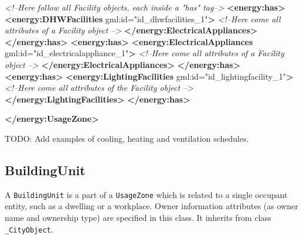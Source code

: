 \documentclass[a4paper,12pt]{article}
\newenvironment{Shaded}{}{}
\newcommand{\KeywordTok}[1]{\textcolor[rgb]{0.00,0.44,0.13}{\textbf{{#1}}}}
\newcommand{\StringTok}[1]{\textcolor[rgb]{0.25,0.44,0.63}{{#1}}}
\newcommand{\CommentTok}[1]{\textcolor[rgb]{0.38,0.63,0.69}{\textit{{#1}}}}
\newcommand{\OtherTok}[1]{\textcolor[rgb]{0.00,0.44,0.13}{{#1}}}
\begin{document}
\begin{Shaded}
\begin{Highlighting}[]
    \CommentTok{<!--Here follow all Facility objects, each inside a "has" tag-->}
    \KeywordTok{<energy:has>}
        \KeywordTok{<energy:DHWFacilities}\OtherTok{ gml:id=}\StringTok{"id_dhwfacilities_1"}\KeywordTok{>}
            \CommentTok{<!--Here come all attributes of a Facility object -->}
        \KeywordTok{</energy:ElectricalAppliances>}
    \KeywordTok{</energy:has>}
    \KeywordTok{<energy:has>}
        \KeywordTok{<energy:ElectricalAppliances}\OtherTok{ gml:id=}\StringTok{"id_electricalappliance_1"}\KeywordTok{>}
            \CommentTok{<!--Here come all attributes of a Facility object -->}
        \KeywordTok{</energy:ElectricalAppliances>}
    \KeywordTok{</energy:has>}
    \KeywordTok{<energy:has>}
        \KeywordTok{<energy:LightingFacilities}\OtherTok{ gml:id=}\StringTok{"id_lightingfacility_1"}\KeywordTok{>}
            \CommentTok{<!--Here come all attributes of the Facility object -->}
        \KeywordTok{</energy:LightingFacilities>}
    \KeywordTok{</energy:has>}

\KeywordTok{</energy:UsageZone>}
\end{Highlighting}
\end{Shaded}

TODO: Add examples of cooling, heating and ventilation schedules.

\subsection{BuildingUnit}\label{buildingunit}

A \texttt{BuildingUnit} is a part of a \texttt{UsageZone} which is
related to a single occupant entity, such as a dwelling or a workplace.
Owner information attributes (as owner name and ownership type) are
specified in this class. It inherits from class \texttt{\_CityObject}.
\end{document}
